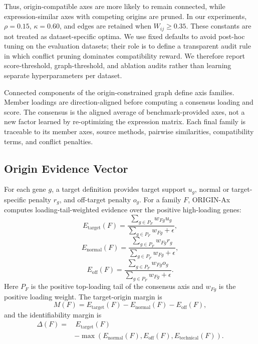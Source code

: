 \documentclass[conference]{IEEEtran}
\begin{document}
Thus, origin-compatible axes are more likely to remain connected, while
expression-similar axes with competing origins are pruned. In our experiments,
$\rho=0.15$, $\kappa=0.60$, and edges are retained when $W_{ij}\geq0.35$.
These constants are not treated as dataset-specific optima. We use fixed
defaults to avoid post-hoc tuning on the evaluation datasets; their role is to
define a transparent audit rule in which conflict pruning dominates
compatibility reward. We therefore report score-threshold, graph-threshold, and
ablation audits rather than learning separate hyperparameters per dataset.

Connected components of the origin-constrained graph define axis families.
Member loadings are direction-aligned before computing a consensus loading and
score. The consensus is the aligned average of benchmark-provided axes, not a
new factor learned by re-optimizing the expression matrix. Each final family is
traceable to its member axes, source methods, pairwise similarities,
compatibility terms, and conflict penalties.

\subsection{Origin Evidence Vector}

For each gene $g$, a target definition provides target support $u_g$, normal
or target-specific penalty $r_g$, and off-target penalty $o_g$. For a family
$F$, ORIGIN-Ax computes loading-tail-weighted evidence over the positive
high-loading genes:
\begin{equation}
E_{\mathrm{target}}(F)=
\frac{\sum_{g\in P_F}w_{Fg}u_g}
{\sum_{g\in P_F}w_{Fg}+\epsilon},
\end{equation}
\begin{equation}
E_{\mathrm{normal}}(F)=
\frac{\sum_{g\in P_F}w_{Fg}r_g}
{\sum_{g\in P_F}w_{Fg}+\epsilon},
\end{equation}
\begin{equation}
E_{\mathrm{off}}(F)=
\frac{\sum_{g\in P_F}w_{Fg}o_g}
{\sum_{g\in P_F}w_{Fg}+\epsilon}.
\end{equation}
Here $P_F$ is the positive top-loading tail of the consensus axis and $w_{Fg}$
is the positive loading weight. The target-origin margin is
\[
M(F)=E_{\mathrm{target}}(F)-E_{\mathrm{normal}}(F)-E_{\mathrm{off}}(F),
\]
and the identifiability margin is
\begin{equation}
\begin{split}
\Delta(F)=&\,E_{\mathrm{target}}(F)\\
&-\max(E_{\mathrm{normal}}(F),E_{\mathrm{off}}(F),
E_{\mathrm{technical}}(F)).
\end{split}
\end{equation}
\end{document}

